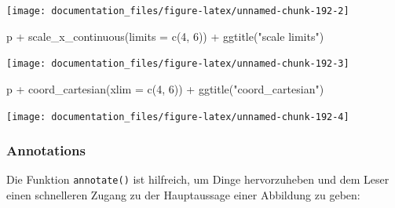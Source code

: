 \documentclass[
]{article}
\newenvironment{Shaded}{\begin{snugshade}}{\end{snugshade}}
\newcommand{\AttributeTok}[1]{\textcolor[rgb]{0.77,0.63,0.00}{#1}}
\newcommand{\DecValTok}[1]{\textcolor[rgb]{0.00,0.00,0.81}{#1}}
\newcommand{\FunctionTok}[1]{\textcolor[rgb]{0.00,0.00,0.00}{#1}}
\newcommand{\NormalTok}[1]{#1}
\newcommand{\SpecialCharTok}[1]{\textcolor[rgb]{0.00,0.00,0.00}{#1}}
\newcommand{\StringTok}[1]{\textcolor[rgb]{0.31,0.60,0.02}{#1}}
\begin{document}
\begin{center}\texttt{[image: documentation\_files/figure-latex/unnamed-chunk-192-2]} \end{center}

\begin{Shaded}
\begin{Highlighting}[]
\NormalTok{p }\SpecialCharTok{+} \FunctionTok{scale\_x\_continuous}\NormalTok{(}\AttributeTok{limits =} \FunctionTok{c}\NormalTok{(}\DecValTok{4}\NormalTok{, }\DecValTok{6}\NormalTok{)) }\SpecialCharTok{+} \FunctionTok{ggtitle}\NormalTok{(}\StringTok{"scale limits"}\NormalTok{)}
\end{Highlighting}
\end{Shaded}

\begin{center}\texttt{[image: documentation\_files/figure-latex/unnamed-chunk-192-3]} \end{center}

\begin{Shaded}
\begin{Highlighting}[]
\NormalTok{p }\SpecialCharTok{+} \FunctionTok{coord\_cartesian}\NormalTok{(}\AttributeTok{xlim =} \FunctionTok{c}\NormalTok{(}\DecValTok{4}\NormalTok{, }\DecValTok{6}\NormalTok{)) }\SpecialCharTok{+} \FunctionTok{ggtitle}\NormalTok{(}\StringTok{"coord\_cartesian"}\NormalTok{)}
\end{Highlighting}
\end{Shaded}

\begin{center}\texttt{[image: documentation\_files/figure-latex/unnamed-chunk-192-4]} \end{center}

\hypertarget{annotations}{%
\subsubsection{Annotations}\label{annotations}}

Die Funktion \texttt{annotate()} ist hilfreich, um Dinge hervorzuheben und dem Leser einen schnelleren Zugang zu der Hauptaussage einer Abbildung zu geben:
\end{document}
